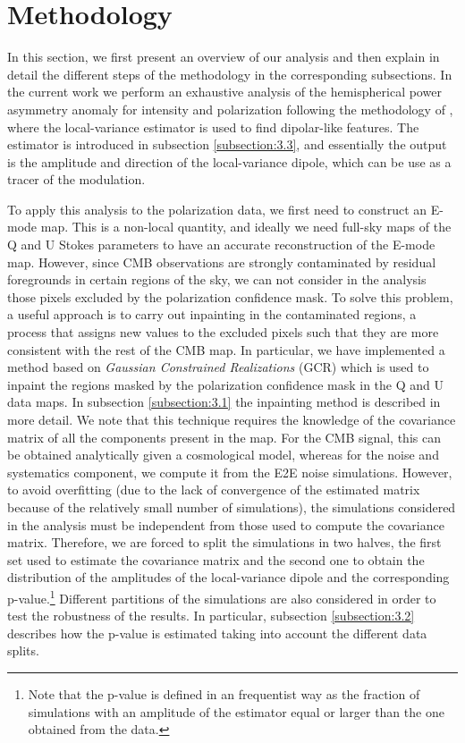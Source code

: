 \section{Methodology} \label{Met}

In this section, we first present an overview of our analysis and then explain in detail the different steps of the methodology in the corresponding subsections.
In the current work we perform an exhaustive analysis of the hemispherical power asymmetry anomaly for intensity and polarization following the methodology of \cite{Planck:2019evm}, where the local-variance estimator is used to find dipolar-like features. The estimator is introduced in subsection \ref{subsection:3.3}, and essentially the output is the amplitude and direction of the local-variance dipole, which can be use as a tracer of the modulation.

To apply this analysis to the polarization data, we first need to construct an E-mode map. This is a non-local quantity, and ideally we need full-sky maps of the Q and U Stokes parameters to have an accurate reconstruction of the E-mode map. However, since CMB observations are strongly contaminated by residual foregrounds in certain regions of the sky, we can not consider in the analysis those pixels excluded by the polarization confidence mask. To solve this problem, a useful approach is to carry out inpainting in the contaminated regions, a process that assigns new values to the excluded pixels such that they are more consistent with the rest of the CMB map. In particular, we have implemented a method based on \emph{Gaussian Constrained Realizations} (GCR) which is used to inpaint the regions masked by the polarization confidence mask in the Q and U data maps.
In subsection \ref{subsection:3.1} the inpainting method is described in more detail. 
We note that this technique requires the knowledge of the covariance matrix of all the components present in the map. For the CMB signal, 
this can be obtained analytically given a cosmological model, whereas for the noise and systematics component, we compute it from the E2E noise simulations. However, to avoid overfitting (due to the lack of convergence of the estimated matrix because of the relatively small number of simulations), 
the simulations considered in the analysis must be independent from those used to compute the covariance matrix. Therefore, we are forced to split the simulations in two halves, the first set used to estimate the covariance matrix and the second one to obtain the distribution of the amplitudes of the local-variance dipole and the corresponding p-value.\footnote{Note that the p-value is defined in an frequentist way as the fraction of simulations with an amplitude of the estimator equal or larger than the one obtained from the data.} Different partitions of the simulations are also considered in order to test the robustness of the results. In particular, subsection \ref{subsection:3.2} describes how the p-value is estimated taking into account the different data splits.

